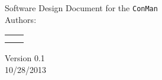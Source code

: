 \begin{titlepage}
\Huge
\vspace{2cm}
\begin{center}
Software Design Document for the \texttt{ConMan}\\
\vspace{3cm}
\Large
Authors:\\ 

\begin{tabular}{l l}\hline
 & \\
 & 
\end{tabular}
\vspace{1cm}

Version 0.1\\
10/28/2013
\end{center}


\end{titlepage}

